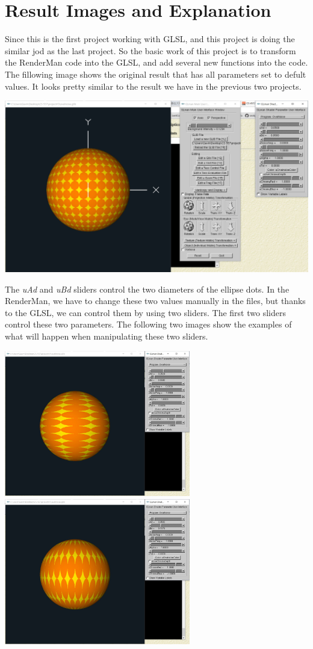 \documentclass[letterpaper,14pt,titlepage,fleqn]{article}
\begin{document}
\section{Result Images and Explanation}
Since this is the first project working with GLSL, and this project is doing the similar jod as the last project. So the basic work of this project is to transform the RenderMan code into the GLSL, and add several new functions into the code. The fillowing image shows the original result that has all parameters set to defult values. It looks pretty similar to the result we have in the previous two projects.
\begin{center}
	\includegraphics[width=5.5in]{origin.jpg}
\end{center}
The \textit{uAd} and \textit{uBd} sliders control the two diameters of the ellipse dots. In the RenderMan, we have to change these two values manually in the files, but thanks to the GLSL, we can control them by using two sliders. The first two sliders control these two parameters. The following two images show the examples of what will happen when manipulating these two sliders.
\begin{center}
	\includegraphics[width=3.2in]{AB1.jpg}
	\includegraphics*[width=3.2in]{AB2.jpg}
\end{center}
\end{document}
